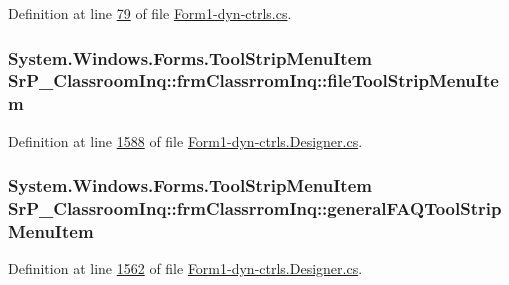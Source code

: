\-Definition at line \hyperlink{_form1-dyn-ctrls_8cs_source_l00079}{79} of file \hyperlink{_form1-dyn-ctrls_8cs_source}{\-Form1-\/dyn-\/ctrls.\-cs}.

\hypertarget{class_sr_p___classroom_inq_1_1frm_classrrom_inq_a4aac2987ba1f61ee4bde4d91cdf35476}{
\subsubsection[{file\-Tool\-Strip\-Menu\-Item}]{\setlength{\rightskip}{0pt plus 5cm}\-System.\-Windows.\-Forms.\-Tool\-Strip\-Menu\-Item {\bf \-Sr\-P\-\_\-\-Classroom\-Inq\-::frm\-Classrrom\-Inq\-::file\-Tool\-Strip\-Menu\-Item}}}
\label{class_sr_p___classroom_inq_1_1frm_classrrom_inq_a4aac2987ba1f61ee4bde4d91cdf35476}


\-Definition at line \hyperlink{_form1-dyn-ctrls_8_designer_8cs_source_l01588}{1588} of file \hyperlink{_form1-dyn-ctrls_8_designer_8cs_source}{\-Form1-\/dyn-\/ctrls.\-Designer.\-cs}.

\hypertarget{class_sr_p___classroom_inq_1_1frm_classrrom_inq_a457cf8afff4e2fd2d76ffa56065350ad}{
\subsubsection[{general\-F\-A\-Q\-Tool\-Strip\-Menu\-Item}]{\setlength{\rightskip}{0pt plus 5cm}\-System.\-Windows.\-Forms.\-Tool\-Strip\-Menu\-Item {\bf \-Sr\-P\-\_\-\-Classroom\-Inq\-::frm\-Classrrom\-Inq\-::general\-F\-A\-Q\-Tool\-Strip\-Menu\-Item}}}
\label{class_sr_p___classroom_inq_1_1frm_classrrom_inq_a457cf8afff4e2fd2d76ffa56065350ad}


\-Definition at line \hyperlink{_form1-dyn-ctrls_8_designer_8cs_source_l01562}{1562} of file \hyperlink{_form1-dyn-ctrls_8_designer_8cs_source}{\-Form1-\/dyn-\/ctrls.\-Designer.\-cs}.

